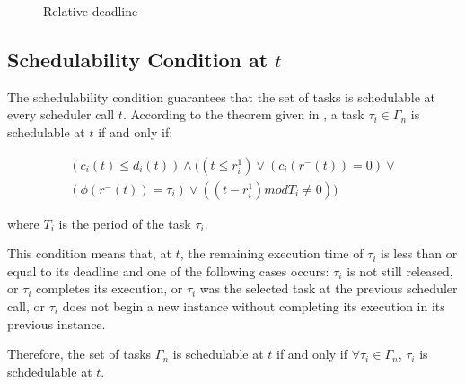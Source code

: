\documentclass[conference,compsocconf]{IEEEtran}
\begin{document}
\begin{figure}[!h]
\begin{center}

\caption{Relative deadline}
\label{figRd}
\end{center}
\end{figure}

\subsection{Schedulability Condition at $t$}

The schedulability condition guarantees that the set of tasks is schedulable at
every scheduler call $t$. According to the theorem given in \cite{icse13}, a
task $\tau_i \in \Gamma_n$ is schedulable at $t$ if and only if:

\begin{comment}
\begin{equation*}\label{condition_ordo}
 \begin{array}{ll}
  \mbox{$(c_i(t) \leq d_i(t)) \wedge$ }\\
  \mbox{$((t \leq r_i^1)\vee (c_i(r^{-}(t))=0)\vee (\phi(r^{-}(t))=\tau_i)  \vee ((t-r_i^1) mod T_i \neq 0))$}
 \end{array}
\end{equation*}
\end{comment}

\begin{equation}\label{condition_ordo}
 \begin{array}{ll}
  \mbox{$(c_i(t) \leq d_i(t)) \wedge ((t \leq r_i^1)\vee (c_i(r^{-}(t))=0)\vee$}\\ 
  \mbox{$(\phi(r^{-}(t))=\tau_i)  \vee ((t-r_i^1) mod T_i \neq 0))$}
 \end{array}
\end{equation}

where $T_i$ is the period of the task $\tau_i$.

This condition means that, at $t$, the remaining execution time of $\tau_i$ is
less than or equal to its deadline and one of the following cases occurs:
$\tau_i$ is not still released, or $\tau_i$ completes its execution, or
$\tau_i$ was the selected task at the previous scheduler call, or $\tau_i$ does
not begin a new instance without completing its execution in its previous
instance.

Therefore, the set of tasks $\Gamma_n$ is schedulable at $t$ if and only if
$\forall \tau_i \in \Gamma_n$, $\tau_i$ is schdedulable at $t$.
\end{document}

